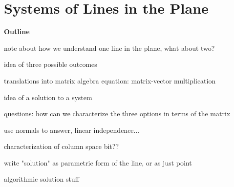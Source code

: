 \documentclass[00-livre-main.tex]{subfiles}
\begin{document}
\chapter{Systems of Lines in the Plane}

\textbf{Outline}
\begin{compactitem}
\item note about how we understand one line in the plane, what about two?
\item idea of three possible outcomes
\item translations into matrix algebra equation: matrix-vector multiplication
\item idea of a solution to a system
\item questions: how can we characterize the three options in terms of the matrix
\item use normals to answer, linear independence...
\item characterization of column space bit??
\item write "solution" as parametric form of the line, or as just point
\item algorithmic solution stuff


\end{compactitem}
\end{document}
